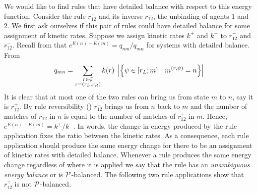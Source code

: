 We would like to find rules that have detailed balance
with respect to this energy function.
Consider the rule $r^+_{12}$ and its inverse $r^-_{12}$,
the unbinding of agents $1$ and $2$.
We first ask ourselves if this pair of rules
could have detailed balance
for some assignment of kinetic rates.
Suppose we assign kinetic rates $k^+$ and $k^-$
to $r^+_{12}$ and $r^-_{12}$.
Recall from  that $e^{E(n)-E(m)} = q_{nm}/q_{mn}$
for systems with detailed balance.
From 
\[ q_{mn} = \sum_{\substack{r \in \mathcal{G}\\r = \left(r_L,r_R\right)}}
   k(r) \; \left\lvert \left\{ \psi \in \left[r_L;m\right] \; | \; m^{(r,\psi)} = n \right\} \right\rvert
\]
It is clear that at most one of the two rules
can bring us from state $m$ to $n$, say it is $r^+_{12}$.
By rule reversibility ()
$r^-_{12}$ brings us from $n$ back to $m$
and the number of matches of $r^-_{12}$ in $n$
is equal to the number of matches of $r^+_{12}$ in $m$.
Hence, $e^{E(n)-E(m)} = k^+/k^-$.
In words, the change in energy produced by the rule application
fixes the ratio between the kinetic rates.
As a consequence,
each rule application should produce the same energy change
for there to be an assignment of kinetic rates with detailed balance.
Whenever a rule produces the same energy change
regardless of where it is applied
we say that the rule has an \emph{unambiguous energy balance}
or is $\mathcal{P}$-balanced.
The following two rule applications show that
$r^+_{12}$ is not $\mathcal{P}$-balanced.
